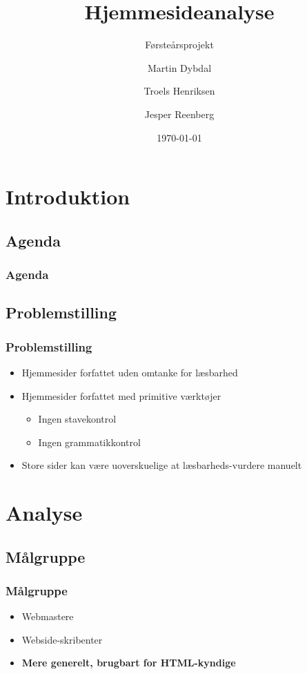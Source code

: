 \documentclass{beamer}
\title{Hjemmesideanalyse}
\subtitle{Førsteårsprojekt}
\author{Martin Dybdal \and Troels Henriksen \and Jesper Reenberg}
\institute{\textrm{Datalogisk Institut, Københavns Universitet}}
\date{\today}
\begin{document}
\frame{\titlepage}


\section{Introduktion}
\subsection{Agenda}
\begin{frame}
  \frametitle{Agenda}
  \tableofcontents
\end{frame}

\subsection{Problemstilling}
\begin{frame}
  \frametitle{Problemstilling}

  \begin{itemize}
  \item<1-> Hjemmesider forfattet uden omtanke for læsbarhed
  \item<2-> Hjemmesider forfattet med primitive værktøjer
    \begin{itemize}
      \item<1-> Ingen stavekontrol
      \item<1-> Ingen grammatikkontrol
    \end{itemize}
  \item<3-> Store sider kan være uoverskuelige at læsbarheds-vurdere manuelt
  \end{itemize}
\end{frame}

\section{Analyse} %
\subsection{Målgruppe}
\begin{frame}
  \frametitle{Målgruppe}
  \begin{itemize}
  \item<1-> Webmastere
  \item<2-> Webside-skribenter
  \item<3-> \textbf{Mere generelt, brugbart for HTML-kyndige}
  \end{itemize}

\end{frame}
\end{document}
